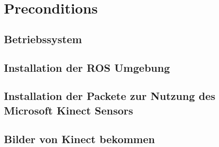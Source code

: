 \chapter{Preconditions}
	\section{Betriebssystem}
	\section{Installation der ROS Umgebung}
	\section{Installation der Packete zur Nutzung des Microsoft Kinect Sensors}
	\section{Bilder von Kinect bekommen}